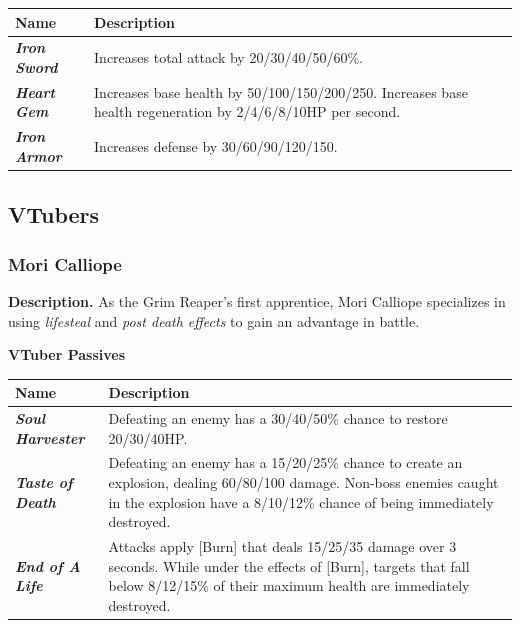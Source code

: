 \documentclass[10pt, a4paper]{article}
\begin{document}
  	\begin{center}
		\begin{supertabular}{|p{2.7cm}|p{6cm}|}
			\hline
			\textbf{Name} & \textbf{Description} \\
			\hline
			\textit{\textbf{Iron Sword}} & Increases total attack by 20/30/40/50/60\%. \\
			\textit{\textbf{Heart Gem}} & Increases base health by 50/100/150/200/250. Increases base health regeneration by 2/4/6/8/10HP per second. \\
			\textit{\textbf{Iron Armor}} & Increases defense by 30/60/90/120/150. \\
			\hline
		\end{supertabular}
	\end{center}

	\subsection{VTubers} \label{VTubers}
  	
  	\subsubsection{Mori Calliope}
  	
  	\textbf{Description.} As the Grim Reaper's first apprentice, Mori Calliope specializes in using \textit{lifesteal} and \textit{post death effects} to gain an advantage in battle.
  	
  	\begin{center}
		\textbf{VTuber Passives}
	\end{center}
	
	\begin{center}
		\begin{supertabular}{|p{2.7cm}|p{6cm}|}
			\hline
			\textbf{Name} & \textbf{Description} \\
			\hline
			\textit{\textbf{Soul Harvester}} & Defeating an enemy has a 30/40/50\% chance to restore 20/30/40HP. \\
			\textit{\textbf{Taste of Death}} & Defeating an enemy has a 15/20/25\% chance to create an explosion, dealing 60/80/100 damage. Non-boss enemies caught in the explosion have a 8/10/12\% chance of being immediately destroyed. \\
			\textit{\textbf{End of A Life}}  & Attacks apply [Burn] that deals 15/25/35 damage over 3 seconds. While under the effects of [Burn], targets that fall below 8/12/15\% of their maximum health are immediately destroyed. \\
			\hline
		\end{supertabular}
	\end{center}
	
\end{document}
